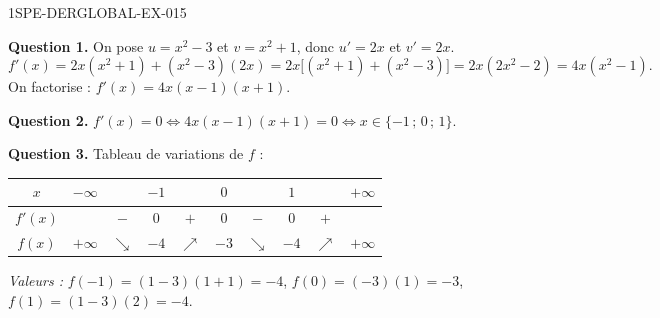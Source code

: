 \begin{corrige}{1SPE-DERGLOBAL-EX-015}

\textbf{Question 1.} On pose $u = x^2-3$ et $v = x^2+1$, donc $u' = 2x$ et $v' = 2x$.
\[
f'(x) = 2x(x^2+1) + (x^2-3)(2x) = 2x\bigl[(x^2+1) + (x^2-3)\bigr] = 2x(2x^2-2) = 4x(x^2-1).
\]
On factorise : $f'(x) = 4x(x-1)(x+1)$.

\textbf{Question 2.} $f'(x) = 0 \iff 4x(x-1)(x+1) = 0 \iff x \in \{-1\,;\,0\,;\,1\}$.

\textbf{Question 3.} Tableau de variations de $f$ :

\begin{center}
\begin{tabular}{|c|ccccccccc|}
\hline
$x$ & $-\infty$ & & $-1$ & & $0$ & & $1$ & & $+\infty$ \\
\hline
$f'(x)$ & & $-$ & $0$ & $+$ & $0$ & $-$ & $0$ & $+$ & \\
\hline
$f(x)$ & $+\infty$ & $\searrow$ & $-4$ & $\nearrow$ & $-3$ & $\searrow$ & $-4$ & $\nearrow$ & $+\infty$ \\
\hline
\end{tabular}
\end{center}

\textit{Valeurs :} $f(-1) = (1-3)(1+1) = -4$, $f(0) = (-3)(1) = -3$, $f(1) = (1-3)(2) = -4$.
\end{corrige}
